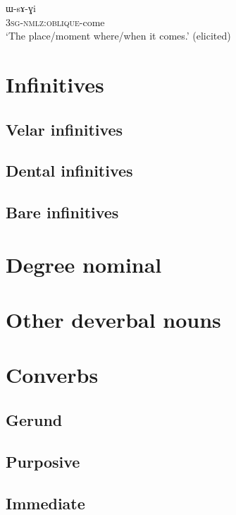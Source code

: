    \begin{exe}
\ex \label{ex:come}
\gll ɯ-sɤ-ɣi    \\
   \textsc{3sg-nmlz:oblique}-come \\
 \glt  `The place/moment where/when it comes.' (elicited)
 \end{exe}
 
\section{Infinitives}

\subsection{Velar infinitives} \label{sec:velar.inf}
\subsection{Dental infinitives} \label{sec:dental.inf}
\subsection{Bare infinitives} \label{sec:bare.inf}
\section{Degree nominal}

\section{Other deverbal nouns}

\section{Converbs}
\subsection{Gerund} \label{sec:gerund}
\subsection{Purposive} \label{sec:purposive.converb}
\subsection{Immediate} \label{sec:immediate.converb}
